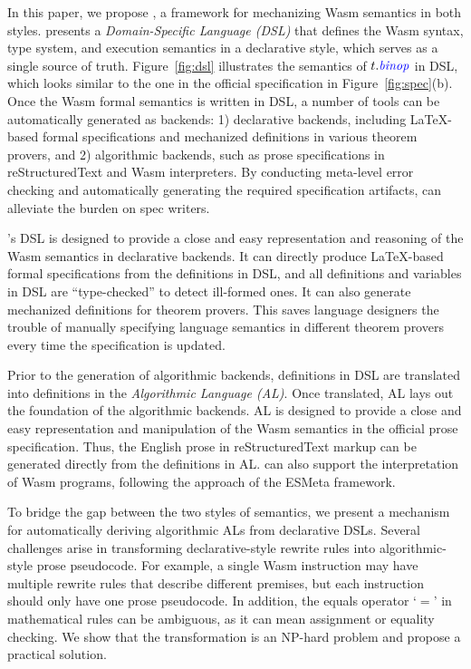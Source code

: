 In this paper, we propose \spectec, a framework for mechanizing Wasm semantics in both styles.
\spectec presents a \emph{Domain-Specific Language (DSL)} that
defines the Wasm syntax, type system, and execution semantics in a declarative style,
which serves as a single source of truth.
Figure~\ref{fig:dsl} illustrates the semantics of $t.\mathit{{\color{blue}{binop}}}$ in DSL,
which looks similar to the one in the official specification in Figure~\ref{fig:spec}(b).
Once the Wasm formal semantics is written in DSL,
a number of tools can be automatically generated as backends:
1) declarative backends, including LaTeX-based formal specifications and
mechanized definitions in various theorem provers, and
2) algorithmic backends, such as prose specifications in reStructuredText and Wasm interpreters.
By conducting meta-level error checking and automatically generating the required specification artifacts,
\spectec can alleviate the burden on spec writers.

\spectec's DSL is designed to provide a close and easy representation and reasoning of
the Wasm semantics in declarative backends.
It can directly produce LaTeX-based formal specifications from the definitions in DSL,
and all definitions and variables in DSL are ``type-checked'' to detect ill-formed ones.
It can also generate mechanized definitions for theorem provers.
This saves language designers the trouble of manually specifying
language semantics in different theorem provers every time the specification is updated.

Prior to the generation of algorithmic backends,
definitions in DSL are translated into definitions in the \emph{Algorithmic Language (AL)}.
Once translated, AL lays out the foundation of the algorithmic backends.
AL is designed to provide a close and easy representation and manipulation of
the Wasm semantics in the official prose specification.
Thus, the English prose in reStructuredText markup can be generated directly from the definitions in AL.
\spectec can also support the interpretation of Wasm programs,
following the approach of the ESMeta framework.

To bridge the gap between the two styles of semantics,
we present a mechanism for automatically deriving algorithmic ALs from declarative DSLs.
Several challenges arise in transforming declarative-style rewrite rules
into algorithmic-style prose pseudocode.
For example, a single Wasm instruction may have multiple rewrite rules
that describe different premises, but each instruction should only have one prose pseudocode.
In addition, the equals operator `$=$' in mathematical rules
can be ambiguous, as it can mean assignment or equality checking.
We show that the transformation is an NP-hard problem
and propose a practical solution.

